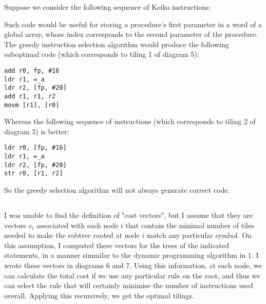 Suppose we consider the following sequence of Keiko instructions:


Such code would be useful for storing a procedure's first parameter in a word of a global array, whose index corresponds to the second parameter of the procedure.
The greedy instruction selection algorithm would produce the following suboptimal code (which corresponds to tiling 1 of diagram 5):

\begin{lstlisting}
add r0, fp, #16
ldr r1, =_a
ldr r2, [fp, #20]
add r1, r1, r2
movm [r1], [r0]
\end{lstlisting}

Whereas the following sequence of instructions (which corresponds to tiling 2 of diagram 5) is better:

\begin{lstlisting}
ldr r0, [fp, #16]
ldr r1, =_a
ldr r2, [fp, #20]
str r0, [r1, r2]
\end{lstlisting}

So the greedy selection algorithm will not always generate correct code.

\subsection{}

I was unable to find the definition of "cost vectors", but I assume that they are vectors $v_i$ associated with each node $i$ that contain the minimal number of tiles needed to make the subtree rooted at node $i$ match any particular symbol.
On this assumption, I computed these vectors for the trees of the indicated statements, in a manner simmilar to the dynamic programming algorithm in 1. I wrote these vectors in diagrams 6 and 7. Using this information, at each node, we can calculate the total cost if we use any particular rule on the root, and thus we can select the rule that will certainly minimise the number of instructions used overall. Applying this recursively, we get the optimal tilings.

